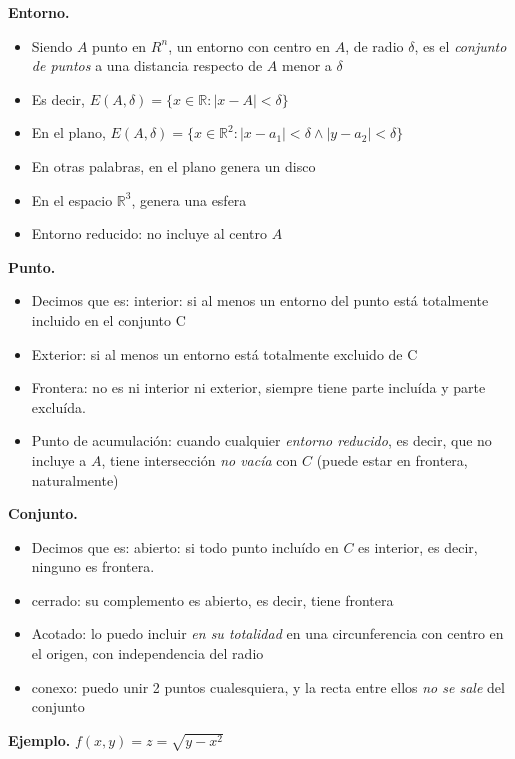 \textbf{Entorno.}
\begin{itemize}
    \item Siendo \(A\) punto en \(R^{n}\), un entorno con centro en \(A\),
    de radio \(\delta\), es el \textit{conjunto de puntos} a una distancia 
    respecto de \(A\) menor a \(\delta\)
    \item Es decir, \(E(A,\delta) = \{x \in \mathbb{R}: |x-A| < \delta\}\)
    \item En el plano, 
    \(E(A,\delta) = \{x \in \mathbb{R}^{2}: |x-a_1| < \delta \land |y-a_2| < \delta\}\)
    \item En otras palabras, en el plano genera un disco 
    \item En el espacio \(\mathbb{R}^{3}\), genera una esfera
    \item Entorno reducido: no incluye al centro \(A\)
\end{itemize}

\textbf{Punto.}
\begin{itemize}
    \item Decimos que es: interior: si al menos un entorno del punto está 
    totalmente incluido en el conjunto C 
    \item Exterior: si al menos un entorno está totalmente excluido de C 
    \item Frontera: no es ni interior ni exterior, siempre tiene parte 
    incluída y parte excluída.
    \item Punto de acumulación: cuando cualquier \textit{entorno reducido},
    es decir, que no incluye a \(A\), tiene intersección \textit{no vacía}
    con \(C\) (puede estar en frontera, naturalmente)
\end{itemize}

\textbf{Conjunto.}
\begin{itemize}
    \item Decimos que es: abierto: si todo punto incluído en \(C\) es interior,
    es decir, ninguno es frontera.
    \item cerrado: su complemento es abierto, es decir, tiene frontera 
    \item Acotado: lo puedo incluir \textit{en su totalidad} en una 
    circunferencia con centro en el origen, con independencia del radio 
    \item conexo: puedo unir 2 puntos cualesquiera, y la recta entre ellos 
    \textit{no se sale} del conjunto
\end{itemize}

\textbf{Ejemplo.}
\(f(x,y) = z = \sqrt{y-x^{2}}\)

